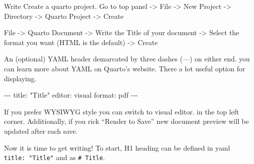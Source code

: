 \documentclass[
  letterpaper,
]{book}
\newenvironment{Shaded}{\begin{snugshade}}{\end{snugshade}}
\newcommand{\NormalTok}[1]{\textcolor[rgb]{0.00,0.23,0.31}{#1}}
\begin{document}
Write Create a quarto project. Go to top panel -\textgreater{} File
-\textgreater{} New Project -\textgreater{} Directory -\textgreater{}
Quarto Project -\textgreater{} Create

File -\textgreater{} Quarto Document -\textgreater{} Write the Title of
your document -\textgreater{} Select the format you want (HTML is the
default) -\textgreater{} Create

An (optional) YAML header demarcated by three dashes (---) on either
end. you can learn more about YAML on Quarto's website. There a lot
useful option for displaying.

\begin{Shaded}
\begin{Highlighting}[]
\NormalTok{{-}{-}{-}}
\NormalTok{title: "Title"}
\NormalTok{editor: visual}
\NormalTok{format: pdf}
\NormalTok{{-}{-}{-}}
\end{Highlighting}
\end{Shaded}

If you prefer WYSIWYG style you can switch to visual editor. in the top
left corner. Additionally, if you rick ``Render to Save'' new document
preview will be updated after each save.

Now it is time to get writing! To start, H1 heading can be defined in
yaml \texttt{title:\ "Title"} and as \texttt{\#\ Title}.
\end{document}
